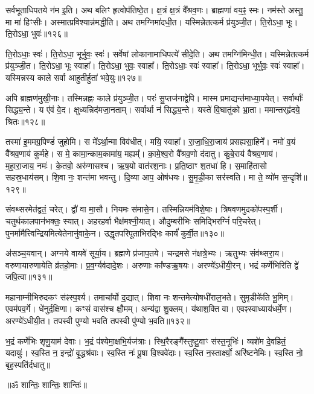 सर्वभूताधिपतये न॑म इ॒ति। अथ बलिꣳ हृत्वोप॑तिष्ठे॒त। 
क्ष॒त्रं क्ष॒त्रं वै᳚श्रव॒णः। ब्राह्मणा॑ वय॒ꣴ॒ स्मः। 
नम॑स्ते अस्तु॒ मा मा॑ हिꣳसीः। अस्मात्प्रविश्यान्न॑मद्धी॒ति। 
अथ तमग्निमा॑दधी॒त। यस्मिन्नेतत्कर्म प्र॑युञ्जी॒त। 
ति॒रोऽधा॒ भूः। ति॒रोऽधा॒ भुवः॑॥१२६॥


ति॒रोऽधाः॒ स्वः॑। ति॒रोऽधा॒ भूर्भुवः॒ स्वः॑। 
सर्वेषां लोकानामाधिपत्ये॑ सीदे॒ति। अथ तमग्नि॑मिन्धी॒त। 
यस्मिन्नेतत्कर्म प्र॑युञ्जी॒त। ति॒रोऽधा॒ भूः स्वाहा᳚। 
ति॒रोऽधा॒ भुवः॒ स्वाहा᳚। ति॒रोऽधाः॒ स्वः॑ स्वाहा᳚। 
ति॒रोऽधा॒ भूर्भुवः॒ स्वः॑ स्वाहा᳚। 
यस्मिन्नस्य काले सर्वा आहुतीर्\mbox{}हुता॑ भवे॒युः॥१२७॥


अपि ब्राह्मण॑मुखी॒नाः। तस्मिन्नह्नः काले प्र॑युञ्जी॒त। 
परः॑ सु॒प्तज॑नाद्वे॒पि। मास्म प्रमाद्यन्त॑माध्या॒पयेत्। 
सर्वार्थाः᳚ सिद्ध्य॒न्ते। य ए॑वं वे॒द। 
क्षुध्यन्निद॑मजा॒नताम्। सर्वार्था न॑ सिद्ध्य॒न्ते। 
यस्ते॑ वि॒घातु॑को भ्रा॒ता। ममान्तर्‌हृ॑दये॒ श्रितः॥१२८॥


तस्मा॑ इ॒ममग्र॒पिण्डं॑ जुहोमि। स मे᳚ऽर्था॒न्मा विव॑धीत्। 
मयि॒ स्वाहा᳚। रा॒जा॒धि॒रा॒जाय॑ प्रसह्यसा॒हिने᳚। 
नमो॑ व॒यं वै᳚श्रव॒णाय॑ कुर्महे। स मे॒ कामा॒न्काम॒कामा॑य॒ मह्यम्‌᳚। 
का॒मे॒श्व॒रो वै᳚श्रव॒णो द॑दातु। कु॒बे॒राय॑ वैश्रव॒णाय॑। 
म॒हा॒रा॒जाय॒ नमः॑। के॒तवो॒ अरु॑णासश्च। 
ऋ॒ष॒यो वात॑रश॒नाः। प्र॒ति॒ष्ठाꣳ श॒तधा॑ हि। 
स॒माहि॑तासो सहस्र॒धाय॑सम्। शि॒वा नः॒ शन्त॑मा भवन्तु। 
दि॒व्या आप॒ ओष॑धयः। सु॒मृ॒डी॒का सर॑स्वति। 
मा ते॒ व्यो॑म स॒न्दृशि॑॥१२९॥\anuvakamend


संवथ्सरमेत॑द्व्रतं॒ चरेत्। द्वौ॑ वा मा॒सौ। 
नियमः स॑मासे॒न। तस्मिन्नियम॑विशे॒षाः। 
त्रिषवणमुदको॑पस्प॒र्शी। चतुर्थकालपान॑भक्तः॒ स्यात्। 
अहरहर्वा भैक्ष॑मश्नी॒यात्। औदुम्बरीभिः समिद्भिरग्निं॑ परि॒चरेत्। 
पुनर्मामैत्त्विन्द्रियमि\-त्येतेनानु॑वाके॒न। उद्धृतपरिपूताभि\-रद्भिः कार्यं॑ कुर्वी॒त॥१३०॥


अ॑सञ्च॒यवान्। अग्नये वायवे॑ सूर्या॒य। 
ब्रह्मणे प्र॑जाप॒तये। चन्द्रमसे न॑क्षत्रे॒भ्यः। 
ऋतुभ्यः संव॑थ्सरा॒य। वरुणायारुणायेति व्र॑तहो॒माः। 
प्र॒व॒र्ग्यव॑दादे॒शः। अरुणाः का᳚ण्डऋ॒षयः। 
अरण्ये॑\-ऽ\-धी\-यी॒रन्। भद्रं कर्णेभिरिति द्वे॑ जपि॒त्वा॥१३१॥


महानाम्नीभिरुदकꣳ स॑ꣴस्प॒र्श्य। तमाचा᳚र्यो द॒द्यात्। 
शिवा नः शन्तमेत्योषधी॑राल॒भते। सुमृडीके॑ति भू॒मिम्। 
एवम॑पव॒र्गे। धे॑नुर्द॒क्षिणा। कꣳसं वास॑श्च क्षौ॒मम्। 
अन्य॑द्वा शु॒क्लम्। य॑थाश॒क्ति वा। एवꣴस्वाध्याय॑धर्मे॒ण। 
अरण्ये॑ऽधीयी॒त। तपस्वी पुण्यो भवति तपस्वी पु॑ण्यो भ॒वति॥१३२॥\anuvakamend


भ॒द्रं कर्णे॑भिः शृणु॒याम॑ देवाः। भ॒द्रं प॑श्येमा॒क्षभि॒र्यज॑त्राः। 
स्थि॒रैरङ्गै᳚स्तुष्टु॒वाꣳ स॑स्त॒नूभिः॑। व्यशे॑म दे॒वहि॑तं॒ यदायुः॑। 
स्व॒स्ति न॒ इन्द्रो॑ वृ॒द्धश्र॑वाः। स्व॒स्ति नः॑ पू॒षा वि॒श्ववे॑दाः। 
स्व॒स्ति न॒स्तार्क्ष्यो॒ अरि॑ष्टनेमिः। स्व॒स्ति नो॒ बृह॒स्पति॑र्दधातु॥\\

\centerline{॥ॐ शान्तिः॒ शान्तिः॒ शान्तिः॑॥}
